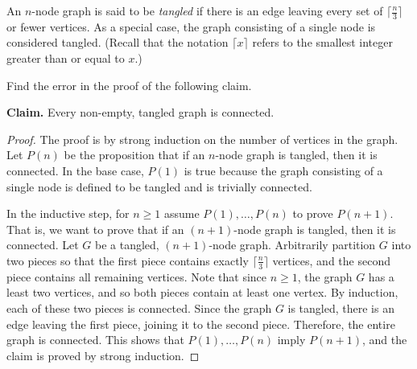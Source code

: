 \documentclass[12pt,twoside]{article}
\begin{document}
\begin{problem}{20}
An $n$-node graph is said to be {\em tangled} if there is an edge
leaving every set of $\lceil\frac{n}{3}\rceil$ or fewer vertices.  As
a special case, the graph consisting of a single node is considered
tangled.  (Recall that the notation $\lceil x \rceil$ refers to the
smallest integer greater than or equal to $x$.)

\begin{problemparts}

 Find the error in the proof of the following claim.

\bigskip

{\bf Claim.} Every non-empty, tangled graph is connected.

\bigskip

\begin{proof}
The proof is by strong induction on the number of vertices in the
graph.  Let $P(n)$ be the proposition that if an $n$-node graph is
tangled, then it is connected.  In the base case, $P(1)$ is true
because the graph consisting of a single node is defined to be tangled
and is trivially connected.

In the inductive step, for $n \geq 1$ assume $P(1), \ldots, P(n)$ to
prove $P(n+1)$.  That is, we want to prove that if an $(n+1)$-node
graph is tangled, then it is connected.  Let $G$ be a tangled,
$(n+1)$-node graph.  Arbitrarily partition $G$ into two pieces so that
the first piece contains exactly $\lceil\frac{n}{3}\rceil$ vertices,
and the second piece contains all remaining vertices.  Note that since
$n \geq 1$, the graph $G$ has a least two vertices, and so both pieces
contain at least one vertex.  By induction, each of these two pieces
is connected.  Since the graph $G$ is tangled, there is an edge
leaving the first piece, joining it to the second piece.  Therefore,
the entire graph is connected.  This shows that $P(1), \ldots, P(n)$
imply $P(n+1)$, and the claim is proved by strong induction.
\end{proof}

\end{problemparts}
\end{problem}
\end{document}
